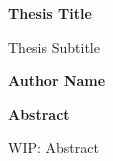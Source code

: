 \thispagestyle{plain}
\begin{center}
    \Large
    \textbf{Thesis Title}

    \vspace{0.4cm}
    \large
    Thesis Subtitle

    \vspace{0.4cm}
    \textbf{Author Name}

    \vspace{0.9cm}
    \textbf{Abstract}
\end{center}

WIP: Abstract